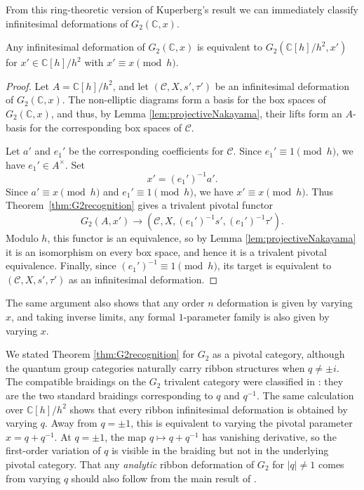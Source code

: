 \documentclass[12pt]{amsart}
\begin{document}
From this ring-theoretic version of Kuperberg's result we can immediately classify infinitesimal deformations of $G_2(\mathbb{C},x)$.

\begin{corollary}
    Any infinitesimal deformation of $G_2(\mathbb{C},x)$ is equivalent to $G_2(\mathbb{C}[h]/h^2,x')$ for $x' \in \mathbb{C}[h]/h^2$ with $x' \equiv x \pmod h$.
\end{corollary}

\begin{proof}
    Let $A=\mathbb{C}[h]/h^2$, and let
    $(\mathcal{C},X,s',\tau')$ be an infinitesimal deformation of
    $G_2(\mathbb{C},x)$. The non-elliptic diagrams form a basis for
    the box spaces of $G_2(\mathbb{C},x)$, and thus, by Lemma \ref{lem:projectiveNakayama},
    their lifts form an $A$-basis for the corresponding box spaces of
    $\mathcal{C}$.

    Let $a'$ and $e_1'$ be the corresponding coefficients for
    $\mathcal{C}$. Since $e_1'\equiv1\pmod h$, we have
    $e_1'\in A^\times$. Set
    \[
        x'=(e_1')^{-1}a'.
    \]
    Since $a'\equiv x\pmod h$ and $e_1'\equiv1\pmod h$, we have
    $x'\equiv x\pmod h$. Thus Theorem~\ref{thm:G2recognition} gives
    a trivalent pivotal functor
    \[
        G_2(A,x')
        \longrightarrow
        (\mathcal{C},X,(e_1')^{-1}s',(e_1')^{-1}\tau').
    \]
    Modulo $h$, this functor is an equivalence, so by Lemma \ref{lem:projectiveNakayama} it is an isomorphism on every box space, and hence it is a trivalent pivotal equivalence. Finally, since
    $(e_1')^{-1}\equiv1\pmod h$, its target is equivalent to
    $(\mathcal{C},X,s',\tau')$ as an infinitesimal deformation.
\end{proof}

\begin{remark}
    The same argument also shows that any order $n$ deformation is given by varying $x$, and taking inverse limits, any formal $1$-parameter family is also given by varying $x$.
\end{remark}

\begin{remark}
    We stated Theorem \ref{thm:G2recognition} for $G_2$ as a pivotal category, although the quantum group categories naturally carry ribbon structures when $q \neq \pm i$. The compatible braidings on the $G_2$ trivalent category were classified in \cite[\S8]{MR3624901}: they are the two standard braidings corresponding to $q$ and $q^{-1}$. The same calculation over $\mathbb{C}[h]/h^2$ shows that every ribbon infinitesimal deformation is obtained by varying $q$. Away from $q=\pm1$, this is equivalent to varying the pivotal parameter $x=q+q^{-1}$. At $q=\pm1$, the map $q\mapsto q+q^{-1}$ has vanishing derivative, so the first-order variation of $q$ is visible in the braiding but not in the underlying pivotal category. That any \emph{analytic} ribbon deformation of $G_2$ for $|q| \neq 1$ comes from varying $q$ should also follow from the main result of \cite{2510.09922}.
\end{remark}
\end{document}
